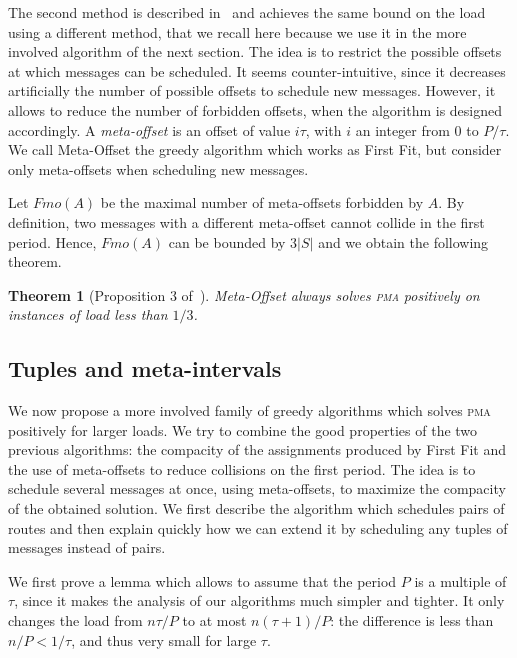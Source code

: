 \documentclass[10pt, conference, letterpaper]{IEEEtran}
\newtheorem{theorem}{Theorem}
\newcommand\pma{\textsc{pma}\xspace}
\begin{document}
The second method is described  in~\cite{dominique2018deterministic} and achieves the same bound on the load using a different method, that we recall here because we use it in the more involved algorithm of the next section.
The idea is to restrict the possible offsets at which messages can be scheduled. It seems counter-intuitive, since it decreases artificially the number of possible offsets to schedule new messages. However, it allows to reduce the number of forbidden offsets, when the algorithm is designed accordingly. A \emph{meta-offset} is an offset of value $i\tau$,
with $i$ an integer from $0$ to $P / \tau$. We call Meta-Offset the greedy algorithm
which works as First Fit, but consider only meta-offsets when scheduling new messages. 

Let $Fmo(A)$ be the maximal number of meta-offsets forbidden by $A$. 
 By definition, two messages with a different meta-offset cannot collide in the first period.
Hence, $Fmo(A)$ can be bounded by $3|S|$ and we obtain the following theorem.


\begin{theorem}[Proposition 3 of~\cite{dominique2018deterministic}]
Meta-Offset always solves \pma positively on instances of load less than $1/3$.
\end{theorem}

\subsection{Tuples and meta-intervals}

We now propose a more involved family of greedy algorithms which 
solves \pma positively for larger loads. We try to combine the good properties of the two previous algorithms: the compacity of the assignments produced by First Fit and the use of meta-offsets to reduce collisions on the first period. The idea is to schedule several messages at once, using meta-offsets, to maximize the compacity of the obtained solution. 
We first describe the algorithm which schedules pairs of routes and then explain quickly how we can extend it by scheduling any tuples of messages instead of pairs.

We first prove a lemma which allows to assume that the period $P$ is a multiple of $\tau$, since it makes the analysis of our algorithms much simpler and tighter. It only changes the load from $n \tau / P$ to at most $n (\tau +1)/ P$: the difference is less than $n /P < 1/\tau$, and thus very small for large $\tau$.
\end{document}
